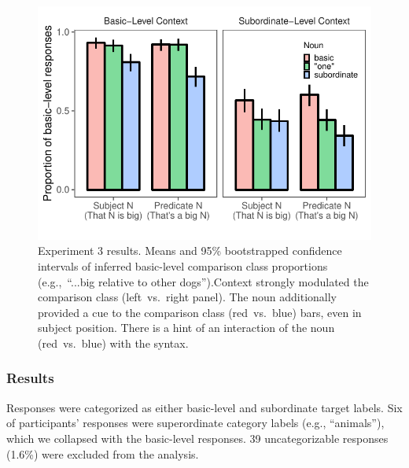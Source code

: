 \documentclass[10pt,letterpaper]{article}
\begin{document}
\begin{figure}[t]
	\begin{center}
		\includegraphics[width=\linewidth]{expt3-cc-inference-revised.pdf}
	\end{center}
	\vspace{-0.5cm}
	\caption{Experiment 3 results. Means and 95\% bootstrapped confidence intervals of inferred basic-level comparison class proportions (e.g.,~“...big relative to other dogs”).Context strongly modulated the comparison class (left~vs.~right panel). The noun additionally provided a cue to the comparison class (red~vs.~blue) bars, even in subject position. There is a hint of an interaction of the noun (red~vs.~blue) with the syntax. 
	}
	\vspace{-0.3cm}
	\label{cc-inference}
\end{figure}

\subsubsection{Results} 
Responses were categorized as either basic-level and subordinate target labels. 
Six of participants' responses were superordinate category labels (e.g., ``animals''), which we collapsed with the basic-level responses. 
39 uncategorizable responses (1.6\%) were excluded from the analysis. 
\end{document}
